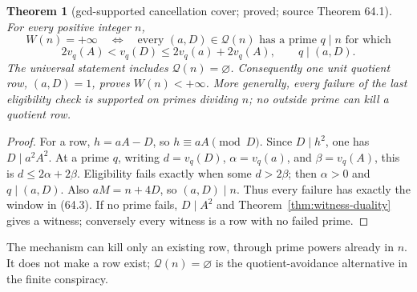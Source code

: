 \documentclass[10pt,reqno]{amsart}
\newtheorem{theorem}{Theorem}[section]
\theoremstyle{definition}
\newcommand{\1}{\mathbf 1}
\begin{document}
\begin{theorem}[gcd-supported cancellation cover; proved; source Theorem 64.1]
\label{thm:cancellation-cover}
For every positive integer $n$,
\[
 W(n)=+\infty\quad\Longleftrightarrow\quad
 \text{every }(a,D)\in\mathcal Q(n)\text{ has a prime }q\mid n\text{ for which}
\]
\begin{equation}\tag{64.3}
 2v_q(A)<v_q(D)\leq2v_q(a)+2v_q(A),\qquad q\mid(a,D).
\end{equation}
The universal statement includes $\mathcal Q(n)=\varnothing$.  Consequently
one unit quotient row, $(a,D)=1$, proves $W(n)<+\infty$.  More generally,
every failure of the last eligibility check is supported on primes dividing
$n$; no outside prime can kill a quotient row.
\end{theorem}
\begin{proof}
For a row, $h=aA-D$, so $h\equiv aA\pmod D$.  Since $D\mid h^2$, one has
$D\mid a^2A^2$.  At a prime $q$, writing
$d=v_q(D)$, $\alpha=v_q(a)$, and $\beta=v_q(A)$, this is
$d\leq2\alpha+2\beta$.  Eligibility fails exactly when some $d>2\beta$;
then $\alpha>0$ and $q\mid(a,D)$.  Also $aM=n+4D$, so $(a,D)\mid n$.
Thus every failure has exactly the window in (64.3).  If no prime fails,
$D\mid A^2$ and Theorem~\ref{thm:witness-duality} gives a witness;
conversely every witness is a row with no failed prime.
\end{proof}
The mechanism can kill only an existing row, through prime powers already
in $n$.  It does not make a row exist; $\mathcal Q(n)=\varnothing$ is the
quotient-avoidance alternative in the finite conspiracy.
\end{document}
